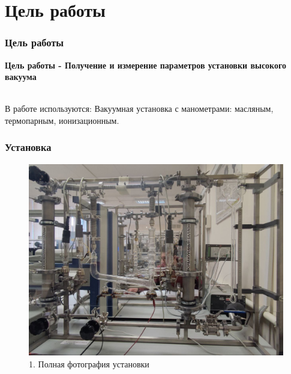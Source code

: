 
\section{Цель работы}
\begin{frame}\frametitle{Цель работы}
    \large \textbf{Цель работы - Получение и измерение параметров установки высокого вакуума}  
    
    \large{\\ В работе используются: Вакуумная установка с манометрами: масляным, термопарным, ионизационным.}\\
    \begin{itemize}
        \large \normalsize{}
    \end{itemize}
\end{frame}


\begin{frame}\frametitle{Установка}
    \begin{figure}
        \centering
        \includegraphics[scale=0.2]{images/full.jpg}
        \caption{1. Полная фотография установки}
        \label{fig:my_label}
    \end{figure}
\end{frame}


